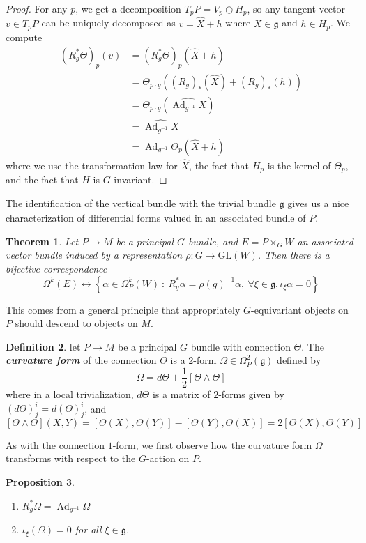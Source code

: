 \documentclass[psamsfonts, 12pt]{amsart}
\newtheorem{thm}{Theorem}[section]
\newtheorem{prop}[thm]{Proposition}
\theoremstyle{definition}
\newtheorem{defn}[thm]{Definition}
\theoremstyle{remark}
\newcommand{\ib}[1]{\textbf{\textit{#1}}}
\newcommand{\GL}{\mathrm{GL}}
\newcommand{\g}{\mathfrak{g}}
\newcommand{\inv}{^{-1}}
\newcommand{\set}[1]{\left\lbrace #1 \right\rbrace}
\newcommand{\enumbreak}{\ \\ \vspace{-\baselineskip}}
\DeclareMathOperator{\Ad}{Ad}
\begin{document}
%
\begin{proof}
For any $p$, we get a decomposition $T_pP = V_p \oplus H_p$, so any tangent vector
$v \in T_pP$ can be uniquely decomposed as $v = \widehat{X} + h$ where $X \in \g$
and $h \in H_p$. We compute
\begin{align*}
(R_g^*\Theta)_p(v) &= (R_g^*\Theta)_p(\widehat{X} + h) \\
&= \Theta_{p \cdot g}((R_g)_*(\widehat{X}) + (R_g)_*(h)) \\
&= \Theta_{p\cdot g}(\widehat{\Ad_{g\inv}X}) \\
&= \widehat{\Ad_{g\inv} X} \\
&= \Ad_{g\inv}\Theta_p(\widehat{X} + h)
\end{align*}
where we use the transformation law for $\widehat{X}$, the fact that $H_p$ is
the kernel of $\Theta_p$, and the fact that $H$ is $G$-invariant.
\end{proof}
%
%
The identification of the vertical bundle with the trivial bundle $\underline{\g}$ gives
us a nice characterization of differential forms valued in an associated bundle of
$P$.
%
\begin{thm}
Let $P \to M$ be a principal $G$ bundle, and $E = P\times_G W$ an associated vector bundle
induced by a representation $\rho : G \to \GL(W)$. Then there is a bijective correspondence
\[
\Omega^k(E) \leftrightarrow\set{\alpha \in \Omega^k_P(W) ~:~
R_g^*\alpha = \rho(g)\inv\alpha, ~\forall\xi\in\g, \iota_\xi\alpha = 0}
\]
\end{thm}
%
This comes from a general principle that appropriately $G$-equivariant objects
on $P$ should descend to objects on $M$.
%
\begin{defn}
let $P \to M$ be a principal $G$ bundle with connection $\Theta$. The \ib{curvature form}
of the connection $\Theta$ is a $2$-form $\Omega \in \Omega^2_P(\g)$ defined by
\[
\Omega = d\Theta + \frac{1}{2}[\Theta \wedge \Theta]
\]
where in a local trivialization, $d\Theta$ is a matrix of $2$-forms given by
$(d\Theta)^i_j = d(\Theta)^i_j$, and
\[
[\Theta \wedge \Theta](X,Y) = [\Theta(X),\Theta(Y)] - [\Theta(Y), \Theta(X)] =
2[\Theta(X), \Theta(Y)]
\]
\end{defn}
%
As with the connection $1$-form, we first observe how the curvature form $\Omega$
transforms with respect to the $G$-action on $P$.
%
\begin{prop} \enumbreak
\begin{enumerate}
  \item $R_g^*\Omega = \Ad_{g\inv}\Omega$
  \item $\iota_\xi(\Omega) = 0$ for all $\xi \in \g$.
\end{enumerate}
\end{prop}
\end{document}
